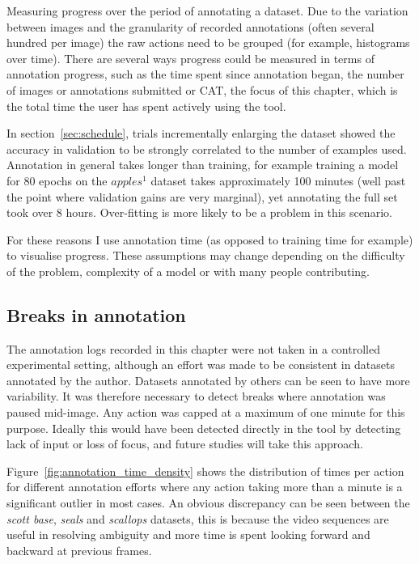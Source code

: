 Measuring progress over the period of annotating a dataset. Due to the variation between images and the granularity of recorded annotations (often several hundred per image) the raw actions need to be grouped (for example, histograms over time). There are several ways progress could be measured in terms of annotation progress, such as the time spent since annotation began, the number of images or annotations submitted or \gls{CAT}, the focus of this chapter, which is the total time the user  has spent actively using the tool.

In section~\ref{sec:schedule}, trials incrementally enlarging the dataset showed the accuracy in validation to be strongly correlated to the number of examples used. Annotation in general takes longer than training, for example training a model for 80 epochs on the $apples^1$ dataset takes approximately 100 minutes (well past the point where validation gains are very marginal), yet annotating the full set took over 8 hours. Over-fitting is more likely to be a problem in this scenario. 

For these reasons I use annotation time (as opposed to training time for example) to visualise progress. These assumptions  may change depending on the difficulty of the problem, complexity of a model or with many people contributing.

\subsection {Breaks in annotation}
\label{sec:break_detection}

The annotation logs recorded in this chapter were not taken in a controlled experimental setting, although an effort was made to be consistent in datasets annotated by the author. Datasets annotated by others can be seen to have more variability. It was therefore necessary to detect breaks where annotation was paused mid-image. Any action was capped at a maximum of one minute for this purpose. Ideally this would have been detected directly in the tool by detecting lack of input or loss of focus, and future studies will take this approach. 

Figure~\ref{fig:annotation_time_density} shows the distribution of times per action for different annotation efforts where any action taking more than a minute is a significant outlier in most cases. An obvious discrepancy can be seen between the \emph{scott base}, \emph{seals} and \emph{scallops} datasets, this is because the video sequences are useful in resolving ambiguity and more time is spent looking forward and backward at previous frames.


